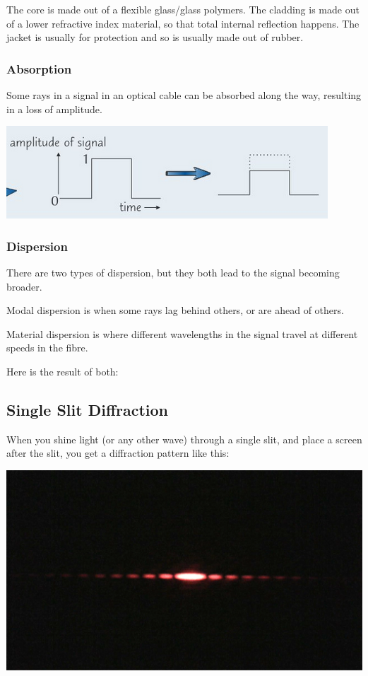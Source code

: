 \documentclass[a4paper, 12pt]{article}
\begin{document}
The core is made out of a flexible glass/glass polymers. The cladding is made out of a lower refractive index material, so that total internal reflection happens. The jacket is usually for protection and so is usually made out of rubber.

\subsubsection{Absorption}

Some rays in a signal in an optical cable can be absorbed along the way, resulting in a loss of amplitude.

\begin{center}
\includegraphics[]{images/opticsAbsorption.png}
\end{center}

\subsubsection{Dispersion}

There are two types of dispersion, but they both lead to the signal becoming broader.

Modal dispersion is when some rays lag behind others, or are ahead of others.

Material dispersion is where different wavelengths in the signal travel at different speeds in the fibre.

Here is the result of both:

\begin{center}

\end{center}

\subsection{Single Slit Diffraction}

When you shine light (or any other wave) through a single slit, and place a screen after the slit, you get a diffraction pattern like this:

\includegraphics[width=\textwidth]{images/singleSlitDiffPattern.jpg}
\end{document}
